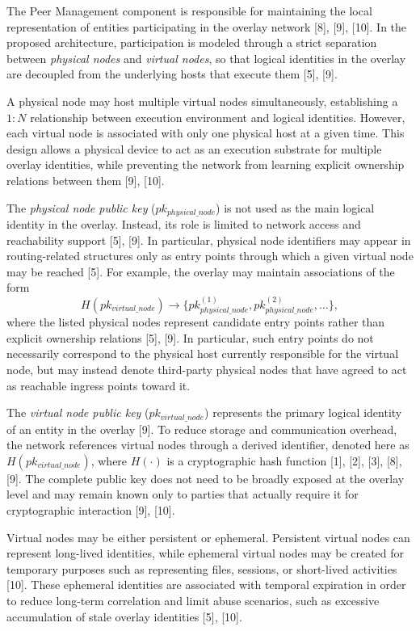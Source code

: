 \documentclass[12pt,a4paper]{article}
\begin{document}
The Peer Management component is responsible for maintaining the local representation of entities participating in the overlay network [8], [9], [10]. In the proposed architecture, participation is modeled through a strict separation between \textit{physical nodes} and \textit{virtual nodes}, so that logical identities in the overlay are decoupled from the underlying hosts that execute them [5], [9].

A physical node may host multiple virtual nodes simultaneously, establishing a $1:N$ relationship between execution environment and logical identities. However, each virtual node is associated with only one physical host at a given time. This design allows a physical device to act as an execution substrate for multiple overlay identities, while preventing the network from learning explicit ownership relations between them [9], [10].

The \textit{physical node public key} ($pk_{physical\_node}$) is not used as the main logical identity in the overlay. Instead, its role is limited to network access and reachability support [5], [9]. In particular, physical node identifiers may appear in routing-related structures only as entry points through which a given virtual node may be reached [5]. For example, the overlay may maintain associations of the form
\[
H(pk_{virtual\_node}) \rightarrow \{pk_{physical\_node}^{(1)}, pk_{physical\_node}^{(2)}, \dots\},
\]
where the listed physical nodes represent candidate entry points rather than explicit
ownership relations [5], [9]. In particular, such entry points do not necessarily correspond
to the physical host currently responsible for the virtual node, but may instead denote
third-party physical nodes that have agreed to act as reachable ingress points toward it.

The \textit{virtual node public key} ($pk_{virtual\_node}$) represents the primary logical identity of an entity in the overlay [9]. To reduce storage and communication overhead, the network references virtual nodes through a derived identifier, denoted here as $H(pk_{virtual\_node})$, where $H(\cdot)$ is a cryptographic hash function [1], [2], [3], [8], [9]. The complete public key does not need to be broadly exposed at the overlay level and may remain known only to parties that actually require it for cryptographic interaction [9], [10].

Virtual nodes may be either persistent or ephemeral. Persistent virtual nodes can represent long-lived identities, while ephemeral virtual nodes may be created for temporary purposes such as representing files, sessions, or short-lived activities [10]. These ephemeral identities are associated with temporal expiration in order to reduce long-term correlation and limit abuse scenarios, such as excessive accumulation of stale overlay identities [5], [10].
\end{document}
